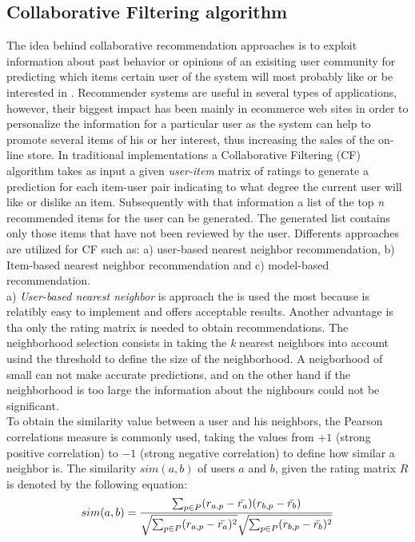 \subsection{Collaborative Filtering algorithm}
The idea behind collaborative recommendation approaches is to exploit
information about past behavior or opinions of an exisiting user community 
for predicting which items certain user of the
system will most probably like or be interested in
\cite{anIntroduction}. Recommender systems are useful in several types
of  applications, however, their biggest impact has been mainly in ecommerce 
web sites in order to  personalize the information for a particular user as
the system can help to promote several items of his or her interest, thus increasing the sales
of the on-line store. In traditional implementations a Collaborative Filtering (CF)
algorithm takes as input a given \textit{user-item} matrix of ratings 
to generate a prediction for each item-user pair indicating to what degree
the current user will like or
dislike an item. Subsequently with that information 
a list of the top \textit{n} recommended 
items for the user can be generated. The generated list contains 
only those items that have not been reviewed by the user.
Differents approaches are utilized for CF such
as:  a) user-based nearest neighbor recommendation, b) Item-based
nearest neighbor  recommendation and c) model-based recommendation.\\
a) \textit{User-based nearest neighbor} is approach the is used the most because
is relatibly easy to implement and offers acceptable results. Another advantage
is tha only the rating matrix is needed to obtain recommendations. 
The neighborhood selection consists in taking the \textit{k} 
nearest neighbors into account usind the threshold to define 
the size of the neighborhood. A neigborhood of small can not make accurate 
predictions, and on the other hand if the
neighborhood is too large the information about the nighbours could not be
significant.\\ To obtain the similarity value between a user and his 
neighbors, the Pearson correlations measure is commonly used, taking the values from
$+1$ (strong positive correlation) to $-1$ (strong negative
correlation) to define how similar a neighbor is. The similarity
$sim(a,b)$ of users $a$ and $b$, given the rating matrix $R$ is
denoted by the following equation:
\begin{equation}\label{eq:pearson1}
\displaystyle sim(a,b) = {\sum_{p \in P}(r_{a,p} - 
\bar{r_a})(r_{b,p}- \bar{r_b}) 
\over \sqrt{\sum_{p \in P}(r_{a,p} - \bar{r_a})^2} 
\sqrt{\sum_{p \in P} 
(r_{b,p}- \bar{r_b})^2}}
\end{equation}
